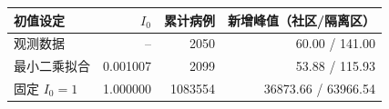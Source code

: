 \begin{tabular}{lrrr}
\toprule
初值设定 & $I_0$ & 累计病例 & 新增峰值（社区/隔离区） \\
\midrule
观测数据 & -- & 2050 & 60.00 / 141.00 \\
最小二乘拟合 & 0.001007 & 2099 & 53.88 / 115.93 \\
固定 $I_0=1$ & 1.000000 & 1083554 & 36873.66 / 63966.54 \\
\bottomrule
\end{tabular}
